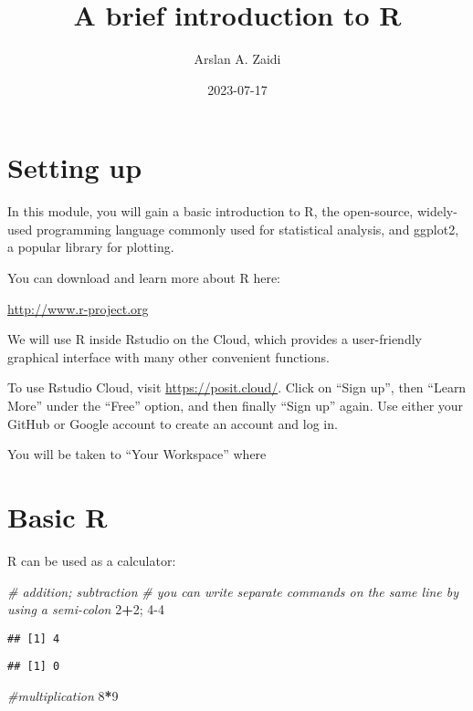 \documentclass[
]{article}
\title{A brief introduction to R}
\author{Arslan A. Zaidi}
\date{2023-07-17}
\newenvironment{Shaded}{\begin{snugshade}}{\end{snugshade}}
\newcommand{\CommentTok}[1]{\textcolor[rgb]{0.56,0.35,0.01}{\textit{#1}}}
\newcommand{\DecValTok}[1]{\textcolor[rgb]{0.00,0.00,0.81}{#1}}
\newcommand{\NormalTok}[1]{#1}
\newcommand{\SpecialCharTok}[1]{\textcolor[rgb]{0.81,0.36,0.00}{\textbf{#1}}}
\begin{document}
\maketitle

\hypertarget{setting-up}{%
\section{Setting up}\label{setting-up}}

In this module, you will gain a basic introduction to R, the
open-source, widely-used programming language commonly used for
statistical analysis, and ggplot2, a popular library for plotting.

You can download and learn more about R here:

\url{http://www.r-project.org}

We will use R inside Rstudio on the Cloud, which provides a
user-friendly graphical interface with many other convenient functions.

To use Rstudio Cloud, visit \url{https://posit.cloud/}. Click on ``Sign
up'', then ``Learn More'' under the ``Free'' option, and then finally
``Sign up'' again. Use either your GitHub or Google account to create an
account and log in.

You will be taken to ``Your Workspace'' where

\hypertarget{basic-r}{%
\section{Basic R}\label{basic-r}}

R can be used as a calculator:

\begin{Shaded}
\begin{Highlighting}[]
\CommentTok{\# addition; subtraction}
\CommentTok{\# you can write separate commands on the same line by using a semi{-}colon}
\DecValTok{2}\SpecialCharTok{+}\DecValTok{2}\NormalTok{; }\DecValTok{4{-}4}
\end{Highlighting}
\end{Shaded}

\begin{verbatim}
## [1] 4
\end{verbatim}

\begin{verbatim}
## [1] 0
\end{verbatim}

\begin{Shaded}
\begin{Highlighting}[]
\CommentTok{\#multiplication}
\DecValTok{8}\SpecialCharTok{*}\DecValTok{9}
\end{Highlighting}
\end{Shaded}
\end{document}
